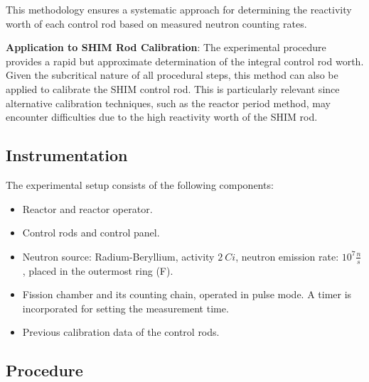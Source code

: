 This methodology ensures a systematic approach for determining the reactivity worth of each control rod based on measured neutron counting rates.


\begin{tcolorbox}[boxstyle2]
    \textbf{Application to SHIM Rod Calibration}:
    The experimental procedure provides a rapid but approximate determination of the integral control rod worth. Given the subcritical nature of all procedural steps, this method can also be applied to calibrate the SHIM control rod. This is particularly relevant since alternative calibration techniques, such as the reactor period method, may encounter difficulties due to the high reactivity worth of the SHIM rod.
\end{tcolorbox}


\subsection{Instrumentation}

The experimental setup consists of the following components:

\begin{itemize}
    \item Reactor and reactor operator.
    \item Control rods and control panel.
    \item Neutron source: Radium-Beryllium, activity $2~Ci$, neutron emission rate: $10^7 \frac{n}{s}$, placed in the outermost ring (F).
    \item Fission chamber and its counting chain, operated in pulse mode. A timer is incorporated for setting the measurement time.
    \item Previous calibration data of the control rods.
\end{itemize}


\subsection{Procedure}

